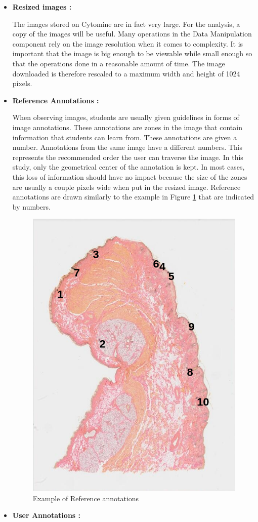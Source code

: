 \documentclass[a4paper,11pt]{report}
\numberwithin{figure}{section} %
\begin{document}
          \begin{itemize}
          \item[\textbullet] \textbf{Resized images :}\newline

          The images stored on Cytomine are in fact very large.
          For the analysis, a copy of the images will be useful.
          Many operations in the Data Manipulation component rely on the image resolution when it comes to complexity.
          It is important that the image is big enough to be viewable while small enough so that the operations done in a reasonable amount of time.
          The image downloaded is therefore rescaled to a maximum width and height of 1024 pixels.\\
          \item[\textbullet] \textbf{Reference Annotations :}\newline

          When observing images, students are usually given guidelines in forms of image annotations.
          These annotations are zones in the image that contain information that students can learn from.
          These annotations are given a number.
          Annotations from the same image have a different numbers.
          This represents the recommended order the user can traverse the image.
          In this study, only the geometrical center of the annotation is kept.
          In most cases, this loss of information should have no impact because the size of the zones are usually a couple pixels wide when put in the resized image.
          Reference annotations are drawn similarly to the example in Figure \ref{fig:annnn} that are indicated by numbers.\\
            \begin{figure}[H]
              \centering
              \includegraphics[width=.4\linewidth]{images/annotations.png}
              \caption{Example of Reference annotations}
              \label{fig:annnn}
            \end{figure}
		\item[\textbullet]  \textbf{User Annotations :}\newline


\end{itemize}
\end{document}

